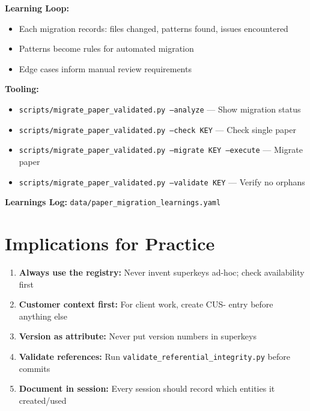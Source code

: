 \begin{tcolorbox}[colback=yellow!5!white, colframe=yellow!75!black,
    title=Paper Migration Algorithm (Incremental Learning)]
\textbf{Learning Loop:}
\begin{itemize}[nosep]
    \item Each migration records: files changed, patterns found, issues encountered
    \item Patterns become rules for automated migration
    \item Edge cases inform manual review requirements
\end{itemize}

\end{tcolorbox}

\textbf{Tooling:}
\begin{itemize}
    \item \texttt{scripts/migrate\_paper\_validated.py --analyze} --- Show migration status
    \item \texttt{scripts/migrate\_paper\_validated.py --check KEY} --- Check single paper
    \item \texttt{scripts/migrate\_paper\_validated.py --migrate KEY --execute} --- Migrate paper
    \item \texttt{scripts/migrate\_paper\_validated.py --validate KEY} --- Verify no orphans
\end{itemize}

\textbf{Learnings Log:} \texttt{data/paper\_migration\_learnings.yaml}


\section{Implications for Practice}
\label{sec:superkey-practice}

\begin{tcolorbox}[colback=green!5!white, colframe=green!75!black,
    title=Practical Implications]
\begin{enumerate}
\item \textbf{Always use the registry:} Never invent superkeys ad-hoc; check availability first
\item \textbf{Customer context first:} For client work, create CUS- entry before anything else
\item \textbf{Version as attribute:} Never put version numbers in superkeys
\item \textbf{Validate references:} Run \texttt{validate\_referential\_integrity.py} before commits
\item \textbf{Document in session:} Every session should record which entities it created/used
\end{enumerate}
\end{tcolorbox}


